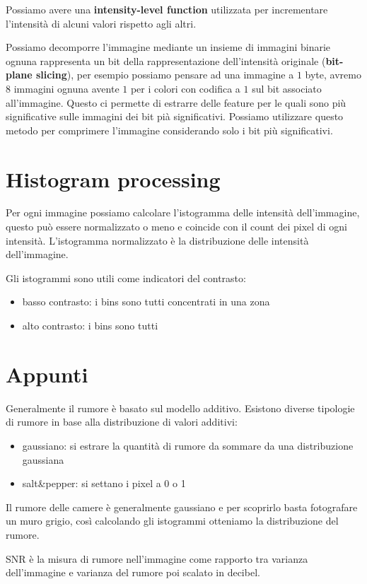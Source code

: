 Possiamo avere una \textbf{intensity-level function} utilizzata per incrementare l'intensità
di alcuni valori rispetto agli altri.

Possiamo decomporre l'immagine mediante un insieme di immagini binarie ognuna
rappresenta un bit della rappresentazione dell'intensità originale (\textbf{bit-plane
    slicing}), per esempio possiamo pensare ad una immagine a $1$ byte, avremo
$8$ immagini ognuna avente $1$ per i colori con codifica a $1$ sul bit associato
all'immagine. Questo ci permette di estrarre delle feature per le quali sono più
significative sulle immagini dei bit pià significativi. Possiamo utilizzare
questo metodo per comprimere l'immagine considerando solo i bit più significativi.

\section{Histogram processing}
Per ogni immagine possiamo calcolare l'istogramma delle intensità dell'immagine,
questo può essere normalizzato o meno e coincide con il count dei pixel di ogni
intensità. L'istogramma normalizzato è la distribuzione delle intensità dell'immagine.

Gli istogrammi sono utili come indicatori del contrasto:
\begin{itemize}
    \item basso contrasto: i bins sono tutti concentrati in una zona
    \item alto contrasto: i bins sono tutti
\end{itemize}


\section{Appunti}
Generalmente il rumore è basato sul modello additivo. 
Esistono diverse tipologie di rumore in base alla distribuzione di valori additivi:
\begin{itemize}
    \item gaussiano: si estrare la quantità di rumore da sommare da una distribuzione 
    gaussiana
    \item salt\&pepper: si settano i pixel a 0 o 1
\end{itemize}

Il rumore delle camere è generalmente gaussiano e per scoprirlo basta fotografare 
un muro grigio, così calcolando gli istogrammi otteniamo la distribuzione del rumore.

SNR è la misura di rumore nell'immagine come rapporto tra varianza dell'immagine 
e varianza del rumore poi scalato in decibel.

